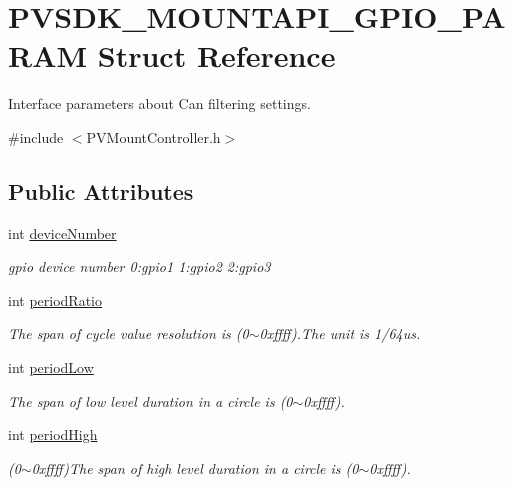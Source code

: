 \hypertarget{struct_p_v_s_d_k___m_o_u_n_t_a_p_i___g_p_i_o___p_a_r_a_m}{}\section{P\+V\+S\+D\+K\+\_\+\+M\+O\+U\+N\+T\+A\+P\+I\+\_\+\+G\+P\+I\+O\+\_\+\+P\+A\+R\+AM Struct Reference}
\label{struct_p_v_s_d_k___m_o_u_n_t_a_p_i___g_p_i_o___p_a_r_a_m}


Interface parameters about Can filtering settings.  




{\ttfamily \#include $<$P\+V\+Mount\+Controller.\+h$>$}

\subsection*{Public Attributes}
\begin{DoxyCompactItemize}
\item 
int \hyperlink{struct_p_v_s_d_k___m_o_u_n_t_a_p_i___g_p_i_o___p_a_r_a_m_aa5e219b2d2e3f339d0654cf7587dda13}{device\+Number}
\begin{DoxyCompactList}\small\item\em gpio device number 0\+:gpio1 1\+:gpio2 2\+:gpio3 \end{DoxyCompactList}\item 
int \hyperlink{struct_p_v_s_d_k___m_o_u_n_t_a_p_i___g_p_i_o___p_a_r_a_m_a43ceaa02b9d648d9acec7eb3d448a7f9}{period\+Ratio}
\begin{DoxyCompactList}\small\item\em The span of cycle value resolution is (0$\sim$0xffff).The unit is 1/64us. \end{DoxyCompactList}\item 
int \hyperlink{struct_p_v_s_d_k___m_o_u_n_t_a_p_i___g_p_i_o___p_a_r_a_m_a192af6ca59f2102d675ec9754e31de45}{period\+Low}
\begin{DoxyCompactList}\small\item\em The span of low level duration in a circle is (0$\sim$0xffff). \end{DoxyCompactList}\item 
int \hyperlink{struct_p_v_s_d_k___m_o_u_n_t_a_p_i___g_p_i_o___p_a_r_a_m_ae5555b54e377d1e76863b12471bc4e0f}{period\+High}
\begin{DoxyCompactList}\small\item\em (0$\sim$0xffff)The span of high level duration in a circle is (0$\sim$0xffff). \end{DoxyCompactList}\end{DoxyCompactItemize}


